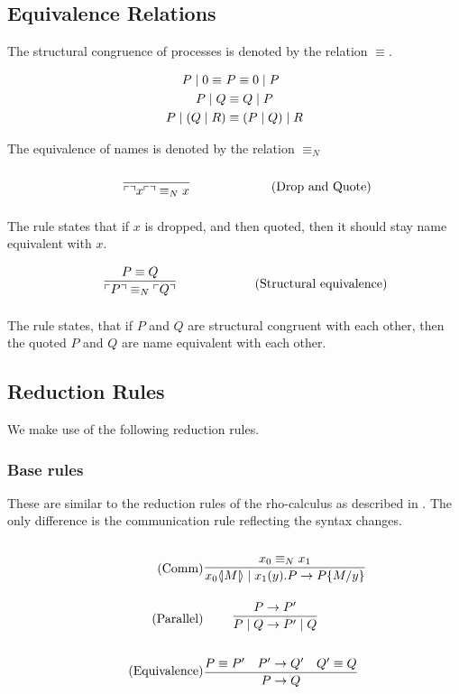 \subsection{Equivalence Relations}
The structural congruence of processes is denoted by the relation $\equiv$.

\begin{align*}
	P\mid 0 \equiv\ &P \equiv 0\mid P\\
    P\mid Q &\equiv Q\mid P\\
    P\mid (Q\mid R)&\equiv (P\mid Q)\mid R
\end{align*}


\FloatBarrier

The equivalence of names is denoted by the relation $\equiv _N$

\begin{align}
	& \infrule{}{\quot{\drop{x}}\equiv _N x} \tag{Drop and Quote}
\end{align}

\noindent
The rule states that if $x$ is dropped, and then quoted, then it should stay name equivalent with $x$.

\begin{align}
	& \infrule{P\equiv Q}{\quot{P} \equiv _N \quot{Q}} \tag{Structural equivalence}
\end{align}

\noindent
The rule states, that if $P$ and $Q$ are structural congruent with each other, then the quoted $P$ and $Q$ are name equivalent with each other.

\FloatBarrier

\subsection{Reduction Rules}
We make use of the following reduction rules.

\subsubsection{Base rules}
These are similar to the reduction rules of the rho-calculus as described in \citep{Meredith2005}. The only difference is the communication rule reflecting the syntax changes.

\begin{align}
	\tag{Comm} \infrule{x_0 \equiv_N x_1}{\lift{x_0}{M}\para\inp{x_1}{y}P\ra P\{M/y\}}&\\
	\tag{Parallel} \infrule{P\ra P'}{P\para Q\ra P'\para Q}&\\
	\tag{Equivalence} \infrule{P\equiv P'\quad P'\ra Q'\quad Q'\equiv Q}{P\ra Q}&
\end{align}

